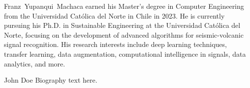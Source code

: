 \documentclass[journal]{IEEEtran}
\begin{document}

%
%
%
\printbibliography



% 
\begin{IEEEbiography}{Franz~Yupanqui~Machaca}
earned his Master's degree in Computer Engineering from the Universidad Católica del Norte in Chile in 2023. He is currently pursuing his Ph.D. in Sustainable Engineering at the Universidad Católica del Norte, focusing on the development of advanced algorithms for seismic-volcanic signal recognition. His research interests include deep learning techniques, transfer learning, data augmentation, computational intelligence in signals, data analytics, and more.
\end{IEEEbiography}


\begin{IEEEbiographynophoto}{John Doe}
Biography text here.
\end{IEEEbiographynophoto}
\end{document}
